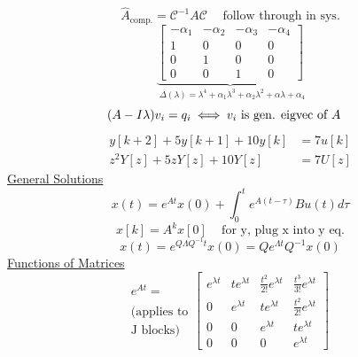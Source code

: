 \documentclass[twocolumn]{article}    %
\begin{document}
\begin{equation*}
    \hat{A}_{\text{comp.}} = \mathcal{C}^{-1} A \mathcal{C} \hspace{15pt} \text{follow through in sys.}
\end{equation*}
\begin{equation*}
    \underbrace{\begin{bmatrix}
        -\alpha_1 & -\alpha_2 & -\alpha_3 & -\alpha_4 \\
        1 & 0 & 0 & 0 \\
        0 & 1 & 0 & 0 \\
        0 & 0 & 1 & 0
    \end{bmatrix}}_{ \hspace{5pt}
    \Delta(\lambda) = 
    \lambda^4 + \alpha_1 \lambda^3 + \alpha_2 \lambda^2 + \alpha \lambda + \alpha_4}
\end{equation*}
\begin{equation*}
    \hspace{-10pt} (A-I\lambda)v_i = q_i \hspace{2.5pt} \Longleftrightarrow \hspace{2.5pt} v_i \text{ is gen. eigvec of } A
\end{equation*}
\begin{align*}
    y[k+2] + 5y[k+1] + 10y[k] &=  7u[k] \\
    z^2Y[z] +5zY[z]+10Y[z]&=7U[z]
\end{align*}
\underline{General Solutions}\\
\begin{equation*}
    x(t) = e^{At}x(0) + \int_0^te^{A(t-\tau)} Bu(t)d\tau
\end{equation*}
\begin{equation*}
    x[k] = A^kx[0] \hspace{10pt} \text{  for y, plug x into y eq.}
\end{equation*}
\begin{equation*}
    x(t) = e^{Q\Lambda Q^{-1}t}x(0) = Qe^{\Lambda t} Q^{-1} x(0)
\end{equation*}
\underline{Functions of Matrices}\\
\begin{equation*}
    \begin{matrix}
        e^{At}= \\
        \\
        \text{(applies to} \\
        \text{J blocks)}
    \end{matrix}
    \begin{bmatrix}
        e^{\lambda t} & t e^{\lambda t} & \frac{t^2}{2!} e^{\lambda t} & \frac{t^3}{3!} e^{\lambda t}\\
        0 & e^{\lambda t} & t e^{\lambda t} & \frac{t^2}{2!} e^{\lambda t} \\
        0 & 0 & e^{\lambda t} & t e^{\lambda t} \\
        0 & 0 & 0 & e^{\lambda t}
    \end{bmatrix} \hspace{5pt} 
\end{equation*}
\end{document}
